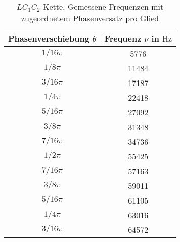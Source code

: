 \begin{table}
\centering
\caption{$LC_1C_2$-Kette, Gemessene Frequenzen mit zugeordnetem Phasenversatz pro Glied}
\label{tab: dispersion_LC1C2}
\begin{tabular}{S S }
\toprule
{Phasenverschiebung $\theta$} & {Frequenz $\nu$ in $\si{\hertz}$}  \\
\midrule
{${1}/{16}\pi$}  & 5776\\
{${1}/{8}\pi$}  & 11484\\
{${3}/{16}\pi$}  & 17187\\
{${1}/{4}\pi$}  & 22418\\
{${5}/{16}\pi$}  & 27092\\
{${3}/{8}\pi$}  & 31348\\
{${7}/{16}\pi$}  & 34736\\
{${1}/{2}\pi$}  & 55425\\
{${7}/{16}\pi$}  & 57163\\
{${3}/{8}\pi$}  & 59011\\
{${5}/{16}\pi$}  & 61105\\
{${1}/{4}\pi$}  & 63016\\
{${3}/{16}\pi$}  & 64572\\
\bottomrule
\end{tabular}
\end{table}
